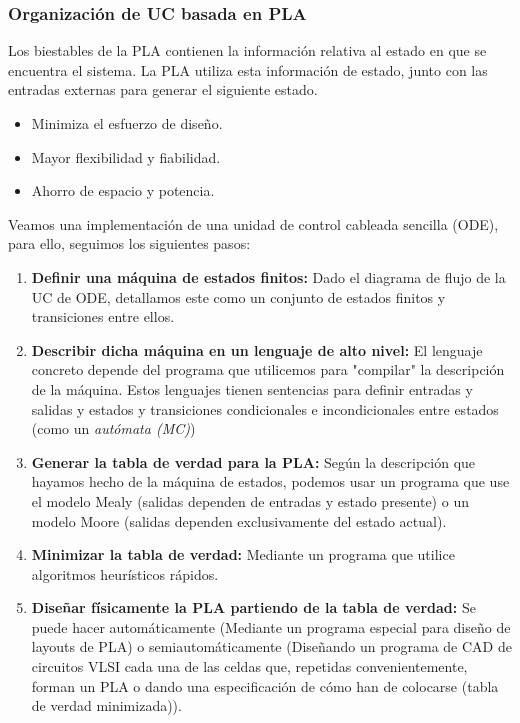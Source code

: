 \subsubsection*{Organización de UC basada en PLA}
Los biestables de la PLA contienen la información relativa al estado en que se encuentra el sistema. La PLA utiliza esta información
de estado, junto con las entradas externas para generar el siguiente estado.
\begin{center}
    \begin{minipage}{0.3\textwidth}
        \begin{itemize}
            \item Minimiza el esfuerzo de diseño.
            \item Mayor flexibilidad y fiabilidad.
            \item Ahorro de espacio y potencia.
        \end{itemize}
    \end{minipage}
    \quad
    \begin{minipage}{0.5\textwidth}
        
    \end{minipage}
\end{center}
\begin{ejemplo}
    Veamos una implementación de una unidad de control cableada sencilla (ODE), para ello, seguimos los siguientes
    pasos:
    \begin{enumerate}
        \item \textbf{Definir una máquina de estados finitos:} Dado el diagrama de flujo de la UC de ODE, detallamos este como un conjunto de estados finitos y transiciones entre ellos.
        \item \textbf{Describir dicha máquina en un lenguaje de alto nivel:} El lenguaje concreto depende del programa que utilicemos para "compilar" la descripción de la máquina.
            Estos lenguajes tienen sentencias para definir entradas y salidas y estados y transiciones condicionales e incondicionales entre estados (como un \textit{autómata (MC)})
        \item \textbf{Generar la tabla de verdad para la PLA:} Según la descripción que hayamos hecho de la máquina de estados, podemos usar un programa que use el modelo Mealy (salidas dependen de entradas y estado presente) o un modelo Moore (salidas dependen exclusivamente del estado actual).
        \item \textbf{Minimizar la tabla de verdad:} Mediante un programa que utilice algoritmos heurísticos rápidos.
    \item \textbf{Diseñar físicamente la PLA partiendo de la tabla de verdad:} Se puede hacer automáticamente (Mediante un programa especial para diseño de layouts de PLA) o semiautomáticamente 
        (Diseñando un programa de CAD de circuitos VLSI cada una de las celdas que, repetidas convenientemente, forman un PLA o dando una especificación de cómo han de colocarse (tabla de verdad minimizada)).
    \end{enumerate}
\end{ejemplo}
